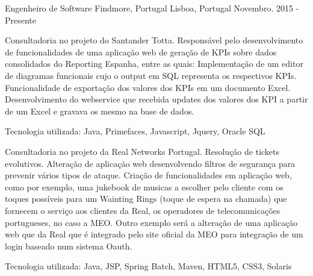 


\begin{cventries}


\cventry
{Engenheiro de Software} %
{Findmore, Portugal} %
{Lisboa, Portugal} %
{Novembro. 2015 - Presente} %
{ %
\begin{cvitems}
\item {Consultadoria no projeto do Santander Totta. Responsável pelo desenvolvimento de funcionalidades de uma aplicação web de geração de KPIs sobre dados consolidados do Reporting Espanha, entre as quais: Implementação de um editor de diagramas funcionais cujo o output em SQL representa os respectivos KPIs. Funcionalidade de exportação dos valores dos KPIs em um documento Excel. Desenvolvimento do webservice que recebida updates dos valores dos KPI a partir de um Excel e gravava os mesmo na base de dados.}
\item {Tecnologia utilizada: Java, Primefaces, Javascript, Jquery, Oracle SQL}
\item {Consultadoria no projeto da Real Networks Portugal. Resolução de tickets evolutivos. Alteração de aplicação web desenvolvendo filtros de segurança para prevenir vários tipos de ataque. Criação de funcionalidades em aplicação web, como por exemplo, uma jukebook de musicas a escolher pelo cliente com os toques possíveis para um Wainting Rings (toque de espera na chamada) que fornecem o serviço aos clientes da Real, os operadores de telecomunicações portugueses, no caso a MEO. Outro exemplo será a alteração de uma aplicação web que da Real que é integrado pelo site oficial da MEO para integração de um login baseado num sistema Oauth. }
\item {Tecnologia utilizada: Java, JSP, Spring Batch, Maven, HTML5, CSS3,  Solaris}
\end{cvitems}
}



\end{cventries}
